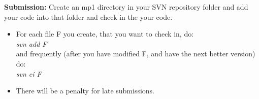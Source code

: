 \documentclass{article}
\begin{document}
\pagebreak


\textbf{Submission:}
Create an mp1 directory in your SVN repository folder and add your code into
that folder and check in the your code.
\begin{itemize}
\item  For each file F you create, that you want to check in, do: \\
        \textit{svn add F}\\
        and frequently (after you have modified F, and have the next better
        version) do:\\ 
        \textit{svn ci F}
\item  There will be a penalty for late submissions.
\end{itemize}
\end{document}
